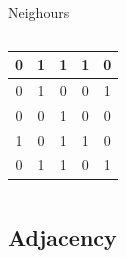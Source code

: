 \documentclass[table]{beamer}
\begin{document}
\begin{frame}
{\begin{block}{Neighours}
\begin{columns}
\begin{column}{.33\linewidth}
\begin{center}
{\begin{tabular}{|c|c|c|c|c|}
                \hline
                0 & 1 & 1 & 1 & 0\\ \hline
                0 & \cellcolor{orounam!50}1 & \cellcolor{orounam!50}0 & \cellcolor{orounam!50}0 & 1\\ \hline
                0 & \cellcolor{orounam!50}0 & \cellcolor{azulunam!50}1 & \cellcolor{orounam!50}0 & 0\\ \hline
                1 & \cellcolor{orounam!50}0 & \cellcolor{orounam!50}1 & \cellcolor{orounam!50}1 & 0\\ \hline
                0 & 1 & 1 & 0 & 1\\ \hline
              \end{tabular}}
          \end{center}
        \end{column}
      \end{columns}
    \end{block}}
\end{frame}

\subsection{Adjacency}
\end{document}

